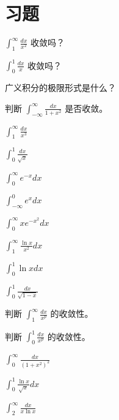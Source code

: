 \section{习题}
\begin{exercise}[0] \(\int_1^\infty \frac{dx}{x^2}\) 收敛吗？\end{exercise}
\begin{exercise}[0] \(\int_0^1 \frac{dx}{x}\) 收敛吗？\end{exercise}
\begin{exercise}[0] 广义积分的极限形式是什么？\end{exercise}
\begin{exercise}[0] 判断 \(\int_{-\infty}^\infty \frac{dx}{1+x^2}\) 是否收敛。\end{exercise}
\begin{exercise}[1] \(\int_1^\infty \frac{dx}{x^3}\)\end{exercise}
\begin{exercise}[1] \(\int_0^1 \frac{dx}{\sqrt{x}}\)\end{exercise}
\begin{exercise}[1] \(\int_0^\infty e^{-x} dx\)\end{exercise}
\begin{exercise}[1] \(\int_{-\infty}^0 e^x dx\)\end{exercise}
\begin{exercise}[2] \(\int_0^\infty xe^{-x^2} dx\)\end{exercise}
\begin{exercise}[2] \(\int_1^\infty \frac{\ln x}{x^2} dx\)\end{exercise}
\begin{exercise}[2] \(\int_0^1 \ln x dx\)\end{exercise}
\begin{exercise}[2] \(\int_0^1 \frac{dx}{\sqrt{1-x}}\)\end{exercise}
\begin{exercise}[3] 判断 \(\int_1^\infty \frac{dx}{x^p}\) 的收敛性。\end{exercise}
\begin{exercise}[3] 判断 \(\int_0^1 \frac{dx}{x^p}\) 的收敛性。\end{exercise}
\begin{exercise}[3] \(\int_0^\infty \frac{dx}{(1+x^2)^2}\)\end{exercise}
\begin{exercise}[3] \(\int_0^1 \frac{\ln x}{\sqrt{x}} dx\)\end{exercise}
\begin{exercise}[3] \(\int_2^\infty \frac{dx}{x\ln x}\)\end{exercise}
